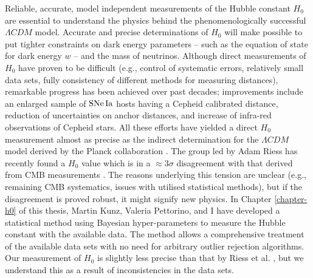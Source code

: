 Reliable, accurate, model independent measurements of the Hubble constant $H_0$ are essential to understand the physics behind the phenomenologically successful $\Lambda CDM$ model. Accurate and precise determinations of $H_0$ will make possible to put tighter constraints on dark energy parameters -- such as the equation of state for dark energy $w$ -- and the mass of neutrinos. Although direct measurements of $H_0$ have proven to be difficult (e.g., control of systematic errors, relatively small data sets, fully consistency of different methods for measuring distances), remarkable progress has been achieved over past decades; improvements include an enlarged sample of $\mathrm{SNe\,Ia}$ hosts having a Cepheid calibrated distance, reduction of uncertainties on anchor distances, and increase of infra-red observations of Cepheid stars. All these efforts have yielded a direct $H_0$ measurement almost as precise as the indirect determination for the $\Lambda CDM$ model derived by the Planck collaboration \cite{Ade:2015xua,Riess:2016jrr}. The group led by Adam Riess has recently found a $H_0$ value which is in a $\approx 3\sigma$ disagreement with that derived from CMB measurements \cite{Riess:2016jrr}. The reasons underlying this tension are unclear (e.g., remaining CMB systematics, issues with utilised statistical methods), but if the disagreement is proved robust, it might signify new physics.  In Chapter \ref{chapter-h0} of this thesis, Martin Kunz, Valeria Pettorino, and I have developed a statistical method using Bayesian hyper-parameters to measure the Hubble constant with the available data. The method allows a comprehensive treatment of the available data sets with no need for arbitrary outlier rejection algorithms. Our measurement of $H_0$ is slightly less precise than that by Riess et al. \cite{Riess:2016jrr}, but we understand this as a result of inconsistencies in the data sets. 